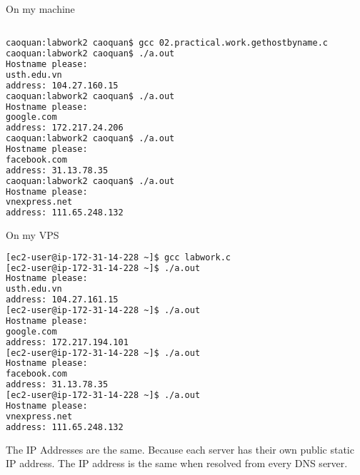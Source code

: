 \documentclass{article}
\begin{document}
\newpage

On my machine
\begin{lstlisting}[language=Bash]

caoquan:labwork2 caoquan$ gcc 02.practical.work.gethostbyname.c
caoquan:labwork2 caoquan$ ./a.out
Hostname please:
usth.edu.vn
address: 104.27.160.15
caoquan:labwork2 caoquan$ ./a.out
Hostname please:
google.com
address: 172.217.24.206
caoquan:labwork2 caoquan$ ./a.out
Hostname please:
facebook.com
address: 31.13.78.35
caoquan:labwork2 caoquan$ ./a.out
Hostname please:
vnexpress.net
address: 111.65.248.132
\end{lstlisting}


On my VPS
\begin{lstlisting}[language=Bash]
[ec2-user@ip-172-31-14-228 ~]$ gcc labwork.c 
[ec2-user@ip-172-31-14-228 ~]$ ./a.out 
Hostname please:
usth.edu.vn
address: 104.27.161.15
[ec2-user@ip-172-31-14-228 ~]$ ./a.out 
Hostname please:
google.com
address: 172.217.194.101
[ec2-user@ip-172-31-14-228 ~]$ ./a.out 
Hostname please:
facebook.com
address: 31.13.78.35
[ec2-user@ip-172-31-14-228 ~]$ ./a.out 
Hostname please:
vnexpress.net
address: 111.65.248.132
\end{lstlisting}

The IP Addresses are the same.
Because each server has their own public static IP address.
The IP address is the same when resolved from every DNS server.

\end{document}
